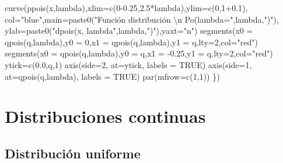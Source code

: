\documentclass[
  letterpaper,
  DIV=11,
  numbers=noendperiod]{scrreprt}
\newenvironment{Shaded}{\begin{snugshade}}{\end{snugshade}}
\newcommand{\AttributeTok}[1]{\textcolor[rgb]{0.40,0.45,0.13}{#1}}
\newcommand{\ConstantTok}[1]{\textcolor[rgb]{0.56,0.35,0.01}{#1}}
\newcommand{\DecValTok}[1]{\textcolor[rgb]{0.68,0.00,0.00}{#1}}
\newcommand{\FloatTok}[1]{\textcolor[rgb]{0.68,0.00,0.00}{#1}}
\newcommand{\FunctionTok}[1]{\textcolor[rgb]{0.28,0.35,0.67}{#1}}
\newcommand{\NormalTok}[1]{\textcolor[rgb]{0.00,0.23,0.31}{#1}}
\newcommand{\OtherTok}[1]{\textcolor[rgb]{0.00,0.23,0.31}{#1}}
\newcommand{\SpecialCharTok}[1]{\textcolor[rgb]{0.37,0.37,0.37}{#1}}
\newcommand{\StringTok}[1]{\textcolor[rgb]{0.13,0.47,0.30}{#1}}
\begin{document}
\begin{Shaded}
\begin{Highlighting}[]
  \FunctionTok{curve}\NormalTok{(}\FunctionTok{ppois}\NormalTok{(x,lambda),}\AttributeTok{xlim=}\FunctionTok{c}\NormalTok{(}\DecValTok{0}\FloatTok{{-}0.25}\NormalTok{,}\FloatTok{2.5}\SpecialCharTok{*}\NormalTok{lambda),}\AttributeTok{ylim=}\FunctionTok{c}\NormalTok{(}\DecValTok{0}\NormalTok{,}\DecValTok{1}\FloatTok{+0.1}\NormalTok{),}
        \AttributeTok{col=}\StringTok{"blue"}\NormalTok{,}\AttributeTok{main=}\FunctionTok{paste0}\NormalTok{(}\StringTok{"Función distribución }\SpecialCharTok{\textbackslash{}n}\StringTok{ Po(lambda="}\NormalTok{,lambda,}\StringTok{")"}\NormalTok{),}
        \AttributeTok{ylab=}\FunctionTok{paste0}\NormalTok{(}\StringTok{"dpois(x, lambda"}\NormalTok{,lambda,}\StringTok{")"}\NormalTok{),}\AttributeTok{yaxt=}\StringTok{"n"}\NormalTok{)}
  \FunctionTok{segments}\NormalTok{(}\AttributeTok{x0 =} \FunctionTok{qpois}\NormalTok{(q,lambda),}\AttributeTok{y0 =} \DecValTok{0}\NormalTok{,}\AttributeTok{x1 =} \FunctionTok{qpois}\NormalTok{(q,lambda),}\AttributeTok{y1 =}\NormalTok{ q,}\AttributeTok{lty=}\DecValTok{2}\NormalTok{,}\AttributeTok{col=}\StringTok{"red"}\NormalTok{)}
  \FunctionTok{segments}\NormalTok{(}\AttributeTok{x0 =} \FunctionTok{qpois}\NormalTok{(q,lambda),}\AttributeTok{y0 =}\NormalTok{ q,}\AttributeTok{x1 =} \SpecialCharTok{{-}}\FloatTok{0.25}\NormalTok{,}\AttributeTok{y1 =}\NormalTok{ q,}\AttributeTok{lty=}\DecValTok{2}\NormalTok{,}\AttributeTok{col=}\StringTok{"red"}\NormalTok{)}
\NormalTok{  ytick}\OtherTok{=}\FunctionTok{c}\NormalTok{(}\FloatTok{0.0}\NormalTok{,q,}\DecValTok{1}\NormalTok{)}
  \FunctionTok{axis}\NormalTok{(}\AttributeTok{side=}\DecValTok{2}\NormalTok{, }\AttributeTok{at=}\NormalTok{ytick, }\AttributeTok{labels =} \ConstantTok{TRUE}\NormalTok{)}
  \FunctionTok{axis}\NormalTok{(}\AttributeTok{side=}\DecValTok{1}\NormalTok{, }\AttributeTok{at=}\FunctionTok{qpois}\NormalTok{(q,lambda), }\AttributeTok{labels =} \ConstantTok{TRUE}\NormalTok{)}
  \FunctionTok{par}\NormalTok{(}\AttributeTok{mfrow=}\FunctionTok{c}\NormalTok{(}\DecValTok{1}\NormalTok{,}\DecValTok{1}\NormalTok{))}
\NormalTok{\})}
\end{Highlighting}
\end{Shaded}

\hypertarget{distribuciones-continuas}{%
\section{Distribuciones continuas}\label{distribuciones-continuas}}

\hypertarget{distribuciuxf3n-uniforme}{%
\subsection{Distribución uniforme}\label{distribuciuxf3n-uniforme}}
\end{document}

